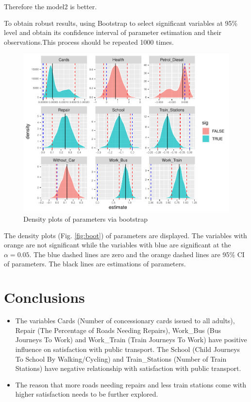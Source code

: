 \documentclass[
]{article}
\begin{document}
Therefore the model2 is better.

To obtain robust results, using Bootstrap to select significant
variables at 95\% level and obtain its confidence interval of parameter
estimation and their observations.This process should be repeated 1000
times.

\begin{figure}

{\centering \includegraphics[width=0.8\linewidth]{RMD-Group-28_files/figure-latex/unnamed-chunk-11-1} 

}

\caption{Density plots of parameters via bootstrap\label{fig:boot}}\label{fig:unnamed-chunk-11}
\end{figure}

The density plots (Fig. \ref{fig:boot}) of parameters are displayed. The
variables with orange are not significant while the variables with blue
are significant at the \(\alpha=0.05\). The blue dashed lines are zero
and the orange dashed lines are 95\% CI of parameters. The black lines
are estimations of parameters.

\hypertarget{sec:Conc}{%
\section{Conclusions}\label{sec:Conc}}

\begin{itemize}
\item
  The variables Cards (Number of concessionary cards issued to all
  adults), Repair (The Percentage of Roads Needing Repairs), Work\_Bus
  (Bus Journeys To Work) and Work\_Train (Train Journeys To Work) have
  positive influence on satisfaction with public transport. The School
  (Child Journeys To School By Walking/Cycling) and Train\_Stations
  (Number of Train Stations) have negative relationship with
  satisfaction with public transport.
\item
  The reason that more roads needing repairs and less train stations
  come with higher satisfaction needs to be further explored.
\end{itemize}
\end{document}
